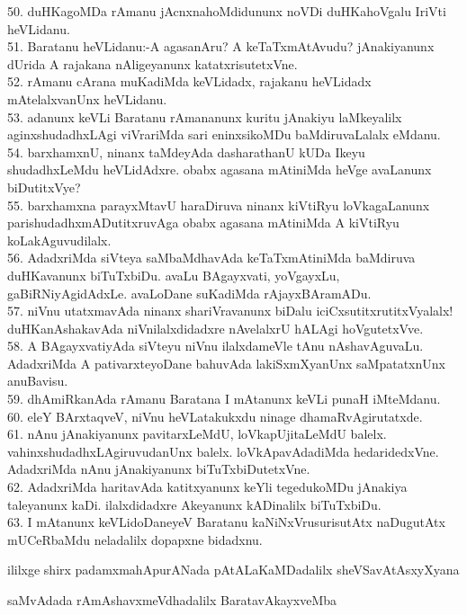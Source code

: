 \documentclass{article}
\begin{document}
50. duHKagoMDa rAmanu jAcnxnahoMdidununx noVDi duHKahoVgalu IriVti heVLidanu.\\
51. Baratanu heVLidanu:-A agasanAru? A keTaTxmAtAvudu? jAnakiyanunx dUrida A rajakana nAligeyanunx katatxrisutetxVne.\\
52. rAmanu cArana muKadiMda keVLidadx, rajakanu heVLidadx mAtelalxvanUnx heVLidanu.\\
53. adanunx keVLi Baratanu rAmananunx kuritu jAnakiyu laMkeyalilx aginxshudadhxLAgi viVrariMda sari eninxsikoMDu baMdiruvaLalalx eMdanu.\\
54. barxhamxnU, ninanx taMdeyAda dasharathanU kUDa Ikeyu shudadhxLeMdu heVLidAdxre. obabx agasana mAtiniMda heVge avaLanunx biDutitxVye?\\
55. barxhamxna parayxMtavU haraDiruva ninanx kiVtiRyu loVkagaLanunx parishudadhxmADutitxruvAga obabx agasana mAtiniMda A kiVtiRyu koLakAguvudilalx.\\
56. AdadxriMda siVteya saMbaMdhavAda keTaTxmAtiniMda baMdiruva duHKavanunx biTuTxbiDu. avaLu BAgayxvati, yoVgayxLu, gaBiRNiyAgidAdxLe. avaLoDane suKadiMda rAjayxBAramADu.\\
57. niVnu utatxmavAda ninanx shariVravanunx biDalu iciCxsutitxrutitxVyalalx! duHKanAshakavAda niVnilalxdidadxre nAvelalxrU hALAgi hoVgutetxVve.\\
58. A BAgayxvatiyAda siVteyu niVnu ilalxdameVle tAnu nAshavAguvaLu. AdadxriMda A pativarxteyoDane bahuvAda lakiSxmXyanUnx saMpatatxnUnx anuBavisu.\\
59. dhAmiRkanAda rAmanu Baratana I mAtanunx keVLi punaH iMteMdanu.\\
60. eleY BArxtaqveV, niVnu heVLatakukxdu ninage dhamaRvAgirutatxde.\\
61.  nAnu jAnakiyanunx pavitarxLeMdU, loVkapUjitaLeMdU balelx. vahinxshudadhxLAgiruvudanUnx balelx. loVkApavAdadiMda hedaridedxVne. AdadxriMda nAnu jAnakiyanunx biTuTxbiDutetxVne.\\
62. AdadxriMda haritavAda katitxyanunx keYli tegedukoMDu jAnakiya taleyanunx kaDi. ilalxdidadxre Akeyanunx kADinalilx biTuTxbiDu.\\
63. I mAtanunx keVLidoDaneyeV Baratanu kaNiNxVrusurisutAtx naDugutAtx mUCeRbaMdu neladalilx dopapxne bidadxnu.

\begin{center}
ililxge shirx padamxmahApurANada pAtALaKaMDadalilx sheVSavAtAsxyXyana
\end{center}

\begin{center}
saMvAdada rAmAshavxmeVdhadalilx BaratavAkayxveMba
\end{center}
\end{document}
